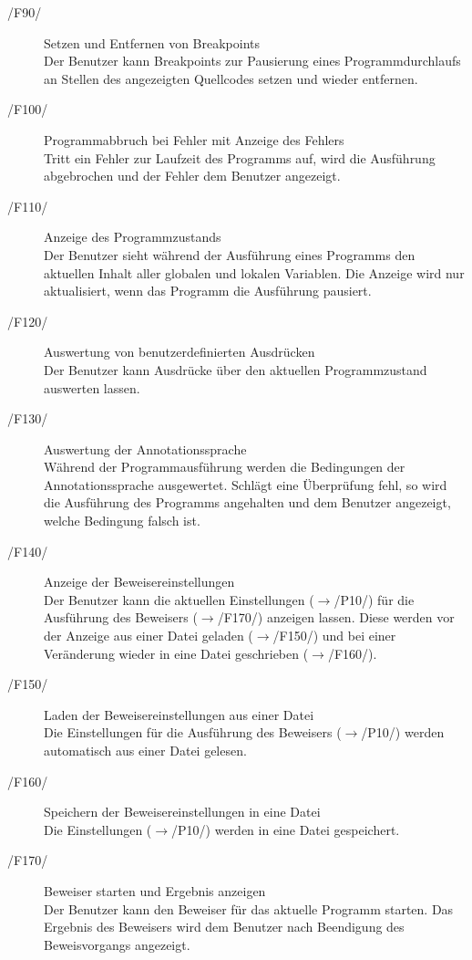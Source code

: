 \documentclass[a4paper,10pt]{article}
\begin{document}
\begin{description}
\begin{tabularx}{\textwidth}{lX}
\end{tabularx}
\item[/F90/] Setzen und Entfernen von Breakpoints\\
Der Benutzer kann Breakpoints zur Pausierung eines Programmdurchlaufs an Stellen des angezeigten Quellcodes setzen und wieder entfernen.
\item[/F100/] Programmabbruch bei Fehler mit Anzeige des Fehlers\\
Tritt ein Fehler zur Laufzeit des Programms auf, wird die Ausführung abgebrochen und der Fehler dem Benutzer angezeigt.
\item[/F110/] Anzeige des Programmzustands\\
Der Benutzer sieht während der Ausführung eines Programms den aktuellen Inhalt aller globalen und lokalen Variablen. Die Anzeige wird nur aktualisiert, wenn das Programm die Ausführung pausiert.
\item[/F120/] Auswertung von benutzerdefinierten Ausdrücken\\
Der Benutzer kann Ausdrücke über den aktuellen Programmzustand auswerten lassen.
\item[/F130/] Auswertung der Annotationssprache\\
Während der Programmausführung werden die Bedingungen der Annotationssprache ausgewertet. Schlägt eine Überprüfung fehl, so wird die Ausführung des Programms angehalten und dem Benutzer angezeigt, welche Bedingung falsch ist.
\item[/F140/] Anzeige der Beweisereinstellungen\\
Der Benutzer kann die aktuellen Einstellungen ($\to$/P10/) für die Ausführung des Beweisers ($\to$/F170/) anzeigen lassen. Diese werden vor der Anzeige aus einer Datei geladen ($\to$/F150/) und bei einer Veränderung wieder in eine Datei geschrieben ($\to$/F160/).
\item[/F150/] Laden der Beweisereinstellungen aus einer Datei\\
Die Einstellungen für die Ausführung des Beweisers ($\to$/P10/) werden automatisch aus einer Datei gelesen.
\item[/F160/] Speichern der Beweisereinstellungen in eine Datei\\
Die Einstellungen ($\to$/P10/) werden in eine Datei gespeichert.
\item[/F170/] Beweiser starten und Ergebnis anzeigen\\
Der Benutzer kann den Beweiser für das aktuelle Programm starten. Das Ergebnis des Beweisers wird dem Benutzer nach Beendigung des Beweisvorgangs angezeigt.
\end{description}
\end{document}
